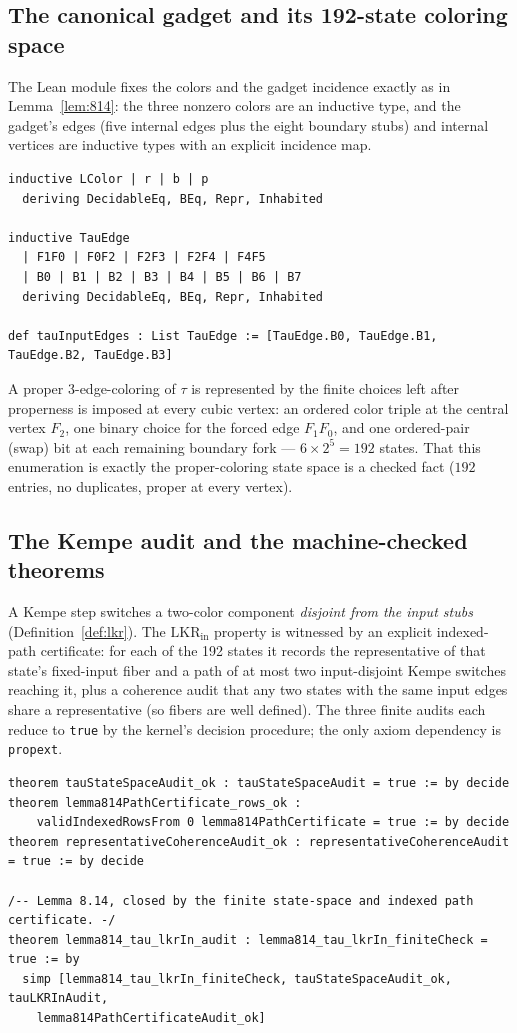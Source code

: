 \documentclass[11pt]{article}
\theoremstyle{definition}
\newcommand{\LKR}{\mathrm{LKR}_{\mathrm{in}}}
\begin{document}
\subsection{The canonical gadget and its 192-state coloring space}

The Lean module fixes the colors and the gadget incidence exactly as in
Lemma~\ref{lem:814}: the three nonzero colors are an inductive type, and the
gadget's edges (five internal edges plus the eight boundary stubs) and internal
vertices are inductive types with an explicit incidence map.

\begin{lstlisting}[language={}]
inductive LColor | r | b | p
  deriving DecidableEq, BEq, Repr, Inhabited

inductive TauEdge
  | F1F0 | F0F2 | F2F3 | F2F4 | F4F5
  | B0 | B1 | B2 | B3 | B4 | B5 | B6 | B7
  deriving DecidableEq, BEq, Repr, Inhabited

def tauInputEdges : List TauEdge := [TauEdge.B0, TauEdge.B1, TauEdge.B2, TauEdge.B3]
\end{lstlisting}

A proper 3-edge-coloring of $\tau$ is represented by the finite choices left
after properness is imposed at every cubic vertex: an ordered color triple at
the central vertex $F_2$, one binary choice for the forced edge $F_1F_0$, and one
ordered-pair (swap) bit at each remaining boundary fork --- $6\times2^{5}=192$
states. That this enumeration is exactly the proper-coloring state space is a
checked fact ($192$ entries, no duplicates, proper at every vertex).

\subsection{The Kempe audit and the machine-checked theorems}

A Kempe step switches a two-color component \emph{disjoint from the input stubs}
(Definition~\ref{def:lkr}). The $\LKR$ property is witnessed by an explicit
indexed-path certificate: for each of the 192 states it records the
representative of that state's fixed-input fiber and a path of at most two
input-disjoint Kempe switches reaching it, plus a coherence audit that any two
states with the same input edges share a representative (so fibers are well
defined). The three finite audits each reduce to \texttt{true} by the kernel's
decision procedure; the only axiom dependency is \texttt{propext}.

\begin{lstlisting}[language={}]
theorem tauStateSpaceAudit_ok : tauStateSpaceAudit = true := by decide
theorem lemma814PathCertificate_rows_ok :
    validIndexedRowsFrom 0 lemma814PathCertificate = true := by decide
theorem representativeCoherenceAudit_ok : representativeCoherenceAudit = true := by decide

/-- Lemma 8.14, closed by the finite state-space and indexed path certificate. -/
theorem lemma814_tau_lkrIn_audit : lemma814_tau_lkrIn_finiteCheck = true := by
  simp [lemma814_tau_lkrIn_finiteCheck, tauStateSpaceAudit_ok, tauLKRInAudit,
    lemma814PathCertificateAudit_ok]
\end{lstlisting}
\end{document}
